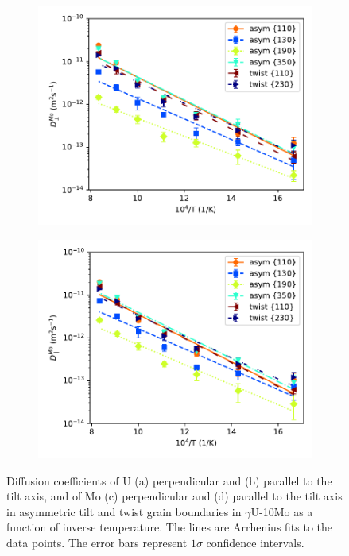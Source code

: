 \documentclass{elsarticle}
\providecommand{\DIFadd}[1]{{\protect\color{blue} \sf #1}} %
\providecommand{\DIFaddFL}[1]{\DIFadd{#1}} %
\providecommand{\DIFaddbeginFL}{} %
\providecommand{\DIFaddendFL}{} %
\begin{document}
\begin{figure}[!ht]
\begin{subfigure}{0.49\textwidth}
	\centering
	\caption{}
	\includegraphics[width=\textwidth]{asym_twist_Mo_Dx.pdf}
\end{subfigure}
\begin{subfigure}{0.49\textwidth}
	\centering
	\caption{}
	\includegraphics[width=\textwidth]{asym_twist_Mo_Dz.pdf}
\end{subfigure}
\caption{Diffusion coefficients of U (a) perpendicular and (b) parallel to the tilt axis, and of Mo (c) perpendicular and (d) parallel to the tilt axis in asymmetric tilt and twist grain boundaries in $\gamma$U-10Mo as a function of inverse temperature. The lines are Arrhenius fits to the data points. \DIFaddbeginFL \DIFaddFL{The error bars represent $1\sigma$ confidence intervals.}\DIFaddendFL }
\label{fig:asym}
\end{figure}
\end{document}
